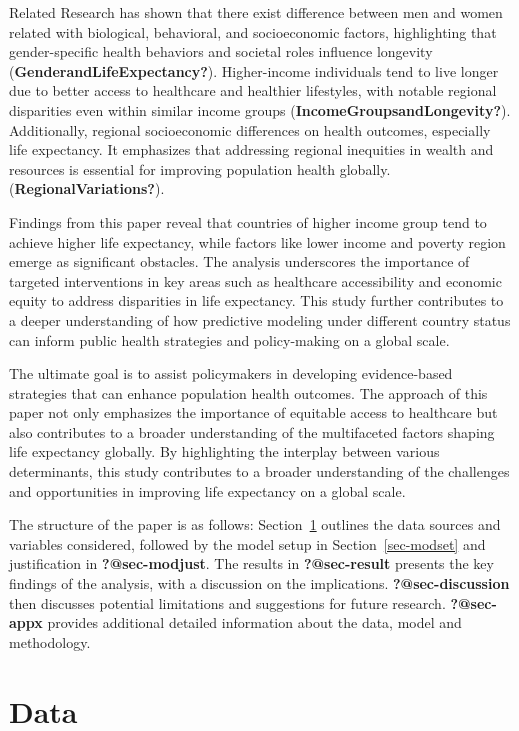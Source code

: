 \documentclass[
  letterpaper,
  DIV=11,
  numbers=noendperiod]{scrartcl}
\begin{document}
Related Research has shown that there exist difference between men and
women related with biological, behavioral, and socioeconomic factors,
highlighting that gender-specific health behaviors and societal roles
influence longevity (\textbf{GenderandLifeExpectancy?}). Higher-income
individuals tend to live longer due to better access to healthcare and
healthier lifestyles, with notable regional disparities even within
similar income groups (\textbf{IncomeGroupsandLongevity?}).
Additionally, regional socioeconomic differences on health outcomes,
especially life expectancy. It emphasizes that addressing regional
inequities in wealth and resources is essential for improving population
health globally. (\textbf{RegionalVariations?}).

Findings from this paper reveal that countries of higher income group
tend to achieve higher life expectancy, while factors like lower income
and poverty region emerge as significant obstacles. The analysis
underscores the importance of targeted interventions in key areas such
as healthcare accessibility and economic equity to address disparities
in life expectancy. This study further contributes to a deeper
understanding of how predictive modeling under different country status
can inform public health strategies and policy-making on a global scale.

The ultimate goal is to assist policymakers in developing evidence-based
strategies that can enhance population health outcomes. The approach of
this paper not only emphasizes the importance of equitable access to
healthcare but also contributes to a broader understanding of the
multifaceted factors shaping life expectancy globally. By highlighting
the interplay between various determinants, this study contributes to a
broader understanding of the challenges and opportunities in improving
life expectancy on a global scale.

The structure of the paper is as follows: Section~\ref{sec-data}
outlines the data sources and variables considered, followed by the
model setup in Section~\ref{sec-modset} and justification in
\textbf{?@sec-modjust}. The results in \textbf{?@sec-result} presents
the key findings of the analysis, with a discussion on the implications.
\textbf{?@sec-discussion} then discusses potential limitations and
suggestions for future research. \textbf{?@sec-appx} provides additional
detailed information about the data, model and methodology.

\section{Data}\label{sec-data}
\end{document}
